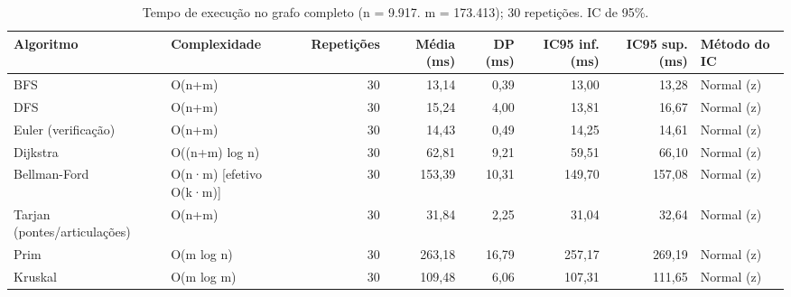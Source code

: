 \begin{table}[ht]
\centering
\caption{Tempo de execução no grafo completo (n = 9.917. m = 173.413); 30 repetições. IC de 95\%.}
\label{tab:tempos}
\small
\begin{tabular}{llrrrrrl}
\hline
Algoritmo & Complexidade & Repetições & Média (ms) & DP (ms) & IC95 inf. (ms) & IC95 sup. (ms) & Método do IC \\
\hline
BFS & O(n+m) & 30 & 13,14 & 0,39 & 13,00 & 13,28 & Normal (z) \\
DFS & O(n+m) & 30 & 15,24 & 4,00 & 13,81 & 16,67 & Normal (z) \\
Euler (verificação) & O(n+m) & 30 & 14,43 & 0,49 & 14,25 & 14,61 & Normal (z) \\
Dijkstra & O((n+m) log n) & 30 & 62,81 & 9,21 & 59,51 & 66,10 & Normal (z) \\
Bellman-Ford & O(n·m) [efetivo O(k·m)] & 30 & 153,39 & 10,31 & 149,70 & 157,08 & Normal (z) \\
Tarjan (pontes/articulações) & O(n+m) & 30 & 31,84 & 2,25 & 31,04 & 32,64 & Normal (z) \\
Prim & O(m log n) & 30 & 263,18 & 16,79 & 257,17 & 269,19 & Normal (z) \\
Kruskal & O(m log m) & 30 & 109,48 & 6,06 & 107,31 & 111,65 & Normal (z) \\
\hline
\end{tabular}
\end{table}

